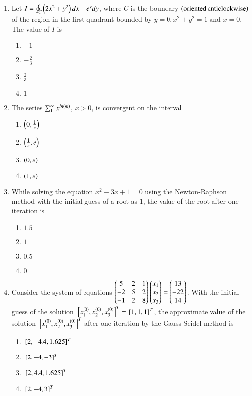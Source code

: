 \documentclass[journal,12pt,onecolumn]{IEEEtran}
\theoremstyle{remark}
\begin{document}
\begin{enumerate}
\item Let $I = \oint_{C}\left(2x^2 + y^2\right)dx + e^{y}dy$, where $C$ is the boundary $\left(\text{oriented anticlockwise}\right)$ of the region in the first quadrant bounded by $y=0,x^2 + y^2 = 1 \text{ and } x=0$. The value of $I$ is
\hfill{}
\begin{enumerate}
\item $-1$
\item $-\frac{2}{3}$
\item $\frac{2}{3}$
\item $1$
\end{enumerate}

\item The series $\sum_{1}^{\infty} x^{ln\left(m\right)}$, $x>0$, is convergent on the interval
\hfill{}
\begin{enumerate}
\item $\left(0,\frac{1}{e}\right)$
\item $\left(\frac{1}{e},e\right)$
\item $\left(0,e\right)$
\item $\left(1,e\right)$
\end{enumerate}

\item While solving the equation $x^2 - 3x + 1=0$ using the Newton-Raphson method with the initial guess of a root as $1$, the value of the root after one iteration is
\hfill{}
\begin{enumerate}
\item $1.5$
\item $1$
\item $0.5$
\item $0$
\end{enumerate}

\item Consider the system of equations
$\begin{pmatrix}5 & 2 & 1\\-2 & 5 & 2\\-1 & 2 & 8\end{pmatrix}\begin{pmatrix}x_1\\x_2\\x_3\end{pmatrix}=\begin{pmatrix}13\\-22\\14\end{pmatrix}$.
With the initial guess of the solution ${}\left[x_{1}^{\left(0\right)},x_{2}^{\left(0\right)},x_{3}^{\left(0\right)}\right]^{T} = {}\left[1,1,1\right]^{T}$, the approximate value of the solution ${}\left[x_{1}^{\left(0\right)},x_{2}^{\left(0\right)},x_{3}^{\left(0\right)}\right]^{T}$ after one iteration by the Gauss-Seidel method is
\hfill{}
\begin{enumerate}
\item ${}\left[2,-4.4,1.625\right]^{T}$
\item ${}\left[2,-4,-3\right]^{T}$
\item ${}\left[2,4.4,1.625\right]^{T}$
\item ${}\left[2,-4,3\right]^{T}$
\end{enumerate}


\end{enumerate}
\end{document}
